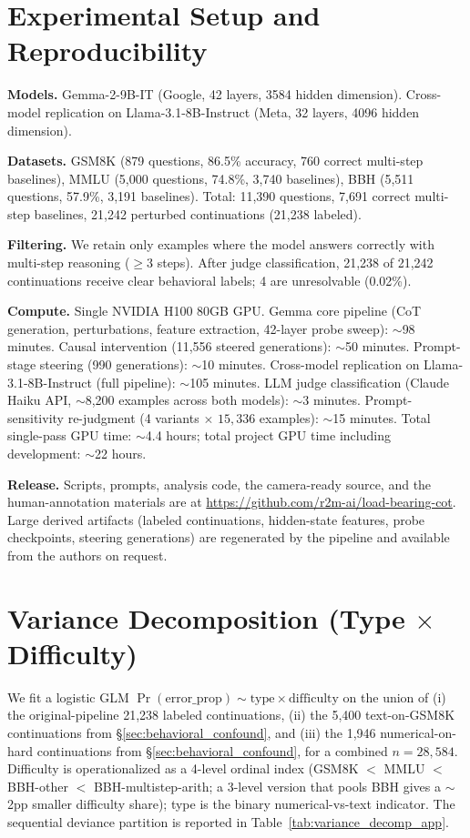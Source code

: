 \documentclass[10pt]{article} %
\begin{document}
\section{Experimental Setup and Reproducibility}
\label{app:reproducibility}

\textbf{Models.} Gemma-2-9B-IT (Google, 42 layers, 3584 hidden dimension). Cross-model replication on Llama-3.1-8B-Instruct (Meta, 32 layers, 4096 hidden dimension).

\textbf{Datasets.} GSM8K (879 questions, 86.5\% accuracy, 760 correct multi-step baselines), MMLU (5,000 questions, 74.8\%, 3,740 baselines), BBH (5,511 questions, 57.9\%, 3,191 baselines). Total: 11,390 questions, 7,691 correct multi-step baselines, 21,242 perturbed continuations (21,238 labeled).

\textbf{Filtering.} We retain only examples where the model answers correctly with multi-step reasoning ($\geq$3 steps). After judge classification, 21,238 of 21,242 continuations receive clear behavioral labels; 4 are unresolvable (0.02\%).

\textbf{Compute.} Single NVIDIA H100 80GB GPU. Gemma core pipeline (CoT generation, perturbations, feature extraction, 42-layer probe sweep): $\sim$98 minutes. Causal intervention (11,556 steered generations): $\sim$50 minutes. Prompt-stage steering (990 generations): $\sim$10 minutes. Cross-model replication on Llama-3.1-8B-Instruct (full pipeline): $\sim$105 minutes. LLM judge classification (Claude Haiku API, $\sim$8,200 examples across both models): $\sim$3 minutes. Prompt-sensitivity re-judgment (4 variants $\times$ $15{,}336$ examples): $\sim$15 minutes. Total single-pass GPU time: $\sim$4.4 hours; total project GPU time including development: $\sim$22 hours.

\textbf{Release.} Scripts, prompts, analysis code, the camera-ready source, and the human-annotation materials are at \url{https://github.com/r2m-ai/load-bearing-cot}. Large derived artifacts (labeled continuations, hidden-state features, probe checkpoints, steering generations) are regenerated by the pipeline and available from the authors on request.


\section{Variance Decomposition (Type \texorpdfstring{$\times$}{x} Difficulty)}
\label{app:variance_decomp}

We fit a logistic GLM $\Pr(\text{error\_prop}) \sim \text{type} \times \text{difficulty}$ on the union of (i) the original-pipeline 21,238 labeled continuations, (ii) the 5,400 text-on-GSM8K continuations from \S\ref{sec:behavioral_confound}, and (iii) the 1,946 numerical-on-hard continuations from \S\ref{sec:behavioral_confound}, for a combined $n = 28{,}584$. Difficulty is operationalized as a 4-level ordinal index (GSM8K $<$ MMLU $<$ BBH-other $<$ BBH-multistep-arith; a 3-level version that pools BBH gives a $\sim$2pp smaller difficulty share); type is the binary numerical-vs-text indicator. The sequential deviance partition is reported in Table~\ref{tab:variance_decomp_app}.
\end{document}

